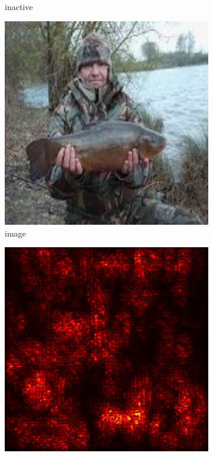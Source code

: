 \documentclass[preprint,12pt]{elsarticle}
\begin{document}
\begin{figure}
\begin{subfigure}{0.14\textwidth}
        \caption{inactive}
    \end{subfigure}
    \hfill
    \begin{subfigure}{0.14\linewidth}
    \centering
    \includegraphics[width=\linewidth]{../visualizations/examples/imagenette/cnn/images/4.png}
    \caption{image}
    \end{subfigure}
    \hfill
    \begin{subfigure}{0.14\linewidth}
        \centering
        \includegraphics[width=\linewidth]{../visualizations/examples/imagenette/cnn/saliency_map/4.png}

\end{subfigure}
\end{figure}
\end{document}
